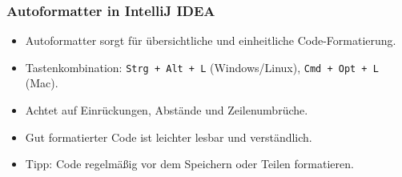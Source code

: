 \documentclass{../../presentation}
\begin{document}
\begin{frame}
  \frametitle{Autoformatter in IntelliJ IDEA}
  \pause
  \begin{itemize}
    \item Autoformatter sorgt für übersichtliche und einheitliche Code-Formatierung.
          \pause
    \item Tastenkombination: \texttt{Strg + Alt + L} (Windows/Linux), \texttt{Cmd + Opt + L} (Mac).
          \pause
    \item Achtet auf Einrückungen, Abstände und Zeilenumbrüche.
          \pause
    \item Gut formatierter Code ist leichter lesbar und verständlich.
          \pause
    \item Tipp: Code regelmäßig vor dem Speichern oder Teilen formatieren.
  \end{itemize}
\end{frame}
\end{document}
